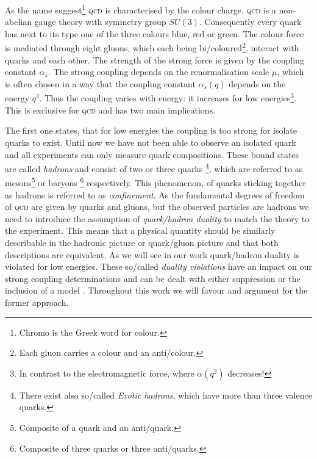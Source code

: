 \documentclass[../../index.tex]{subfiles}
\begin{document}
As the name suggest\footnote{Chromo is the Greek word for colour.} \textsc{qcd}
is characterised by the colour charge. \textsc{qcd} is a non-abelian gauge
theory with symmetry group $SU(3)$. Consequently every quark has next to its
type one of the three colours blue, red or green. The colour force is mediated
through eight gluons, which each being bi\-/coloured\footnote{Each gluon carries
  a colour and an anti\-/colour.}, interact with quarks and each other. The
strength of the strong force is given by the coupling constant $\alpha_s$. The
strong coupling depends on the renormalisation scale $\mu$, which is often
chosen in a way that the coupling constant $\alpha_s(q)$ depends on the energy
$q^2$. Thus the coupling varies with energy: it increases for low
energies\footnote{In contrast to the electromagnetic force, where $\alpha(q^2)$
  decreases!}. This is exclusive for \textsc{qcd} and has two main implications.

The first one states, that for low energies the coupling is too strong for
isolate quarks to exist. Until now we have not been able to observe an isolated
quark and all experiments can only measure quark compositions. These bound
states are called \textit{hadrons} and consist of two or three quarks
\footnote{There exist also so\-/called \textit{Exotic hadrons}, which have more
  than three valence quarks.}, which are referred to as
mesons\footnote{Composite of a quark and an anti\-/quark.} or baryons
\footnote{Composite of three quarks or three anti\-/quarks.} respectively. This
phenomenon, of quarks sticking together as hadrons is referred to as
\textit{confinement}. As the fundamental degrees of freedom of \textsc{qcd} are
given by quarks and gluons, but the observed particles are hadrons we need to
introduce the assumption of \textit{quark\-/hadron duality} to match the theory
to the experiment. This means that a physical quantity should be similarly
describable in the hadronic picture or quark\-/gluon picture and that both
descriptions are equivalent. As we will see in our work quark\-/hadron duality
is violated for low energies. These so\-/called \textit{duality violations} have
an impact on our strong coupling determinations and can be dealt with either
suppression or the inclusion of a model \cite{Pich2006,Cata2008}. Throughout
this work we will favour and argument for the former approach.
\end{document}
